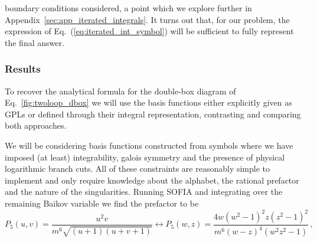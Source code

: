 \documentclass[a4paper,11pt]{article}
\begin{document}
boundary conditions considered, a point which we explore further in Appendix~\ref{sec:app_iterated_integrals}. It turns out that, for our problem, the expression of Eq.~(\ref{eq:iterated_int_symbol}) will be sufficient to fully represent the final answer.

\subsubsection{Results}
To recover the analytical formula for the double-box diagram of Eq.~\eqref{fig:twoloop_dbox} we will use the basis functions either explicitly given as GPLs or defined through their integral representation, contrasting and comparing both approaches.

We will be considering basis functions constructed from symbols where we have imposed (at least) integrability, galois symmetry and the presence of physical logarithmic branch cuts. All of these constraints are reasonably simple to implement and only require knowledge about the alphabet, the rational prefactor and the nature of the singularities. Running \textsc{SOFIA} and integrating over the remaining Baikov variable we find the prefactor to be 
\begin{equation}
    P_5(u,v)= \frac{u^2 v}{m^6 \sqrt{(u+1) (u+v+1)}} \leftrightarrow P_5(w,z)= \frac{4 w \left(w^2-1\right)^2 z \left(z^2-1\right)^2}{m^6 (w-z)^4 \left(w^2 z^2-1\right)} \,,
\end{equation}
\end{document}
